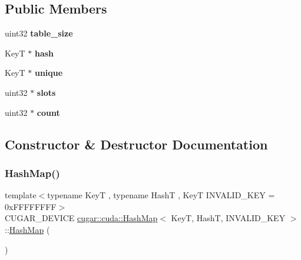 \subsection*{Public Members}
\begin{DoxyCompactItemize}
\item 
\mbox{\label{structcugar_1_1cuda_1_1_hash_map_a241e20f15a2be2ea915c62ad7bf5d261}} 
uint32 {\bfseries table\+\_\+size}
\item 
\mbox{\label{structcugar_1_1cuda_1_1_hash_map_ae23faa45f2bdfb7182fab74f458b1595}} 
KeyT $\ast$ {\bfseries hash}
\item 
\mbox{\label{structcugar_1_1cuda_1_1_hash_map_a66b789608dd604438914dee4d05299f2}} 
KeyT $\ast$ {\bfseries unique}
\item 
\mbox{\label{structcugar_1_1cuda_1_1_hash_map_ae4f0eda4ad786b7f097a5be74ead3a58}} 
uint32 $\ast$ {\bfseries slots}
\item 
\mbox{\label{structcugar_1_1cuda_1_1_hash_map_aa6ac5580a461770b9d53970b9f557ad4}} 
uint32 $\ast$ {\bfseries count}
\end{DoxyCompactItemize}


\subsection{Constructor \& Destructor Documentation}
\mbox{\label{structcugar_1_1cuda_1_1_hash_map_a010078c91599bfd5472498b17a00338f}} 
\subsubsection{\texorpdfstring{Hash\+Map()}{HashMap()}\hspace{0.1cm}{\footnotesize\ttfamily [1/2]}}
{\footnotesize\ttfamily template$<$typename KeyT , typename HashT , KeyT I\+N\+V\+A\+L\+I\+D\+\_\+\+K\+EY = 0x\+F\+F\+F\+F\+F\+F\+FF$>$ \\
C\+U\+G\+A\+R\+\_\+\+D\+E\+V\+I\+CE \hyperlink{structcugar_1_1cuda_1_1_hash_map}{cugar\+::cuda\+::\+Hash\+Map}$<$ KeyT, HashT, I\+N\+V\+A\+L\+I\+D\+\_\+\+K\+EY $>$\+::\hyperlink{structcugar_1_1cuda_1_1_hash_map}{Hash\+Map} (\begin{DoxyParamCaption}{ }\end{DoxyParamCaption})\hspace{0.3cm}{\ttfamily [inline]}}

